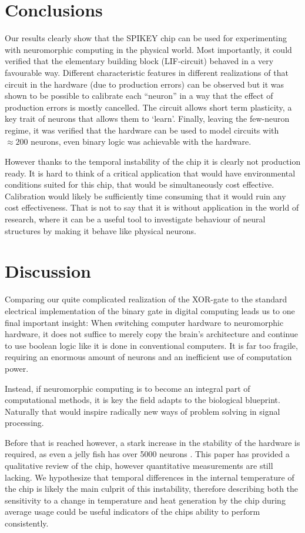 \documentclass[a4paper,twocolumn]{article}
\begin{document}
\section{Conclusions}
Our results clearly show that the SPIKEY chip can be used for experimenting with
neuromorphic computing in the physical world. Most importantly, it could
verified that the elementary building block (LIF-circuit) behaved in a very
favourable way. Different characteristic features in different realizations of
that circuit in the hardware (due to production errors) can be observed but it
was shown to be possible to calibrate each  ``neuron'' in a way that the effect
of production errors is mostly cancelled. The circuit allows short term
plasticity,  a key trait of neurons that allows them to `learn'.  Finally,
leaving the few-neuron regime, it was verified that the hardware can be used to
model circuits with $\approx 200$ neurons, even binary logic was achievable with
the hardware.

However thanks to the temporal instability of the chip it is clearly not
production ready. It is hard to think of a critical application that would have
environmental conditions suited for this chip, that would be simultaneously cost
effective. Calibration would likely be sufficiently time consuming that it would
ruin any cost effectiveness. That is not to say that it is without application
in the world of research, where it can be a useful tool to investigate behaviour
of neural structures by making it behave like physical neurons.

\section{Discussion}
Comparing our quite complicated realization of the XOR-gate to the standard
electrical implementation of the binary gate in digital computing leads us to
one final important insight: When switching computer hardware to neuromorphic
hardware, it does not suffice to merely copy the brain's architecture and
continue to use boolean logic like it is done in conventional computers. It is
far too fragile, requiring an enormous amount of neurons and an inefficient use
of computation power.

Instead, if neuromorphic computing is to become an integral part of
computational methods, it is key the field adapts to the biological blueprint.
Naturally that would inspire radically new ways of problem solving in signal
processing.

Before that is reached however, a stark increase in the stability of the
hardware is required, as even a jelly fish has over 5000 neurons
\cite{neuronsjellyfish}. This paper has provided a qualitative review of the
chip, however quantitative measurements are still lacking. We hypothesize that
temporal differences in the internal temperature of the chip is likely the main
culprit of this instability, therefore describing both the sensitivity to a
change in temperature and heat generation by the chip during average usage could
be useful indicators of the chips ability to perform consistently.




\end{document}
